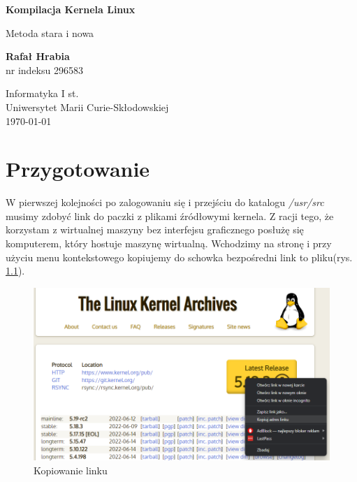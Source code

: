 \documentclass[a4paper,12pt,oneside]{book} %
\begin{document}
\sloppy
\thispagestyle{empty}
\begin{titlepage}
	\begin{center}
		\vspace*{1cm}
		
		\Huge
		\textbf{Kompilacja Kernela Linux}
		
		\vspace{0.5cm}
		\LARGE
		Metoda stara i nowa
		
		\vspace{1.5cm}
		
		\textbf{Rafał Hrabia}\\
		\small nr indeksu 296583
		
		\vfill
		
		\vspace{0.8cm}
		
		\Large
		Informatyka I st.\\
		Uniwersytet Marii Curie-Skłodowskiej\\
		\today
		
	\end{center}
\end{titlepage}
\newpage{}

\thispagestyle{empty}
\newpage{}

\tableofcontents{}

\chapter{Przygotowanie}
\label{Przygotowanie}

W pierwszej kolejności po zalogowaniu się i przejściu do katalogu \emph{/usr/src} musimy zdobyć link do paczki z plikami źródłowymi kernela. Z racji tego, że
korzystam z wirtualnej maszyny bez interfejsu graficznego posłużę się komputerem, który hostuje maszynę wirtualną. Wchodzimy na stronę i przy użyciu menu
kontekstowego kopiujemy do schowka bezpośredni link to pliku(rys. \ref{link-copy}).

\begin{figure}[h]
	\centering
	\includegraphics[scale=0.5]{01-link-copy.png}
	\caption{Kopiowanie linku}
	\label{link-copy}
\end{figure}
\end{document}
